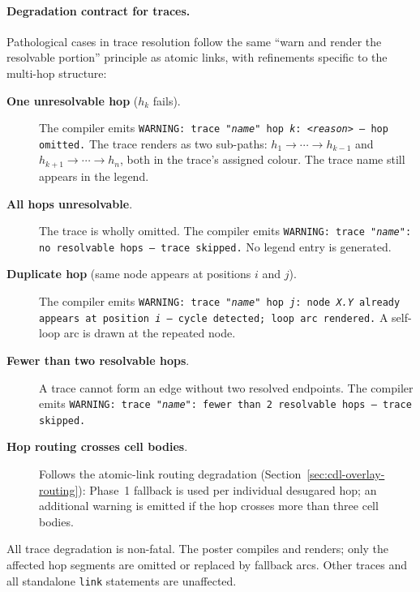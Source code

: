 \paragraph{Degradation contract for traces.}

Pathological cases in trace resolution follow the same ``warn and render
the resolvable portion'' principle as atomic links, with refinements specific
to the multi-hop structure:

\begin{description}
  \item[\textbf{One unresolvable hop} ($h_k$ fails).]  The compiler emits
    \texttt{WARNING: trace "\textit{name}" hop \textit{k}: \textit{<reason>}
    --- hop omitted.}  The trace renders as two sub-paths: $h_1 \to \cdots
    \to h_{k-1}$ and $h_{k+1} \to \cdots \to h_n$, both in the trace's
    assigned colour.  The trace name still appears in the legend.

  \item[\textbf{All hops unresolvable}.]  The trace is wholly omitted.
    The compiler emits \texttt{WARNING: trace "\textit{name}": no resolvable
    hops --- trace skipped.}  No legend entry is generated.

  \item[\textbf{Duplicate hop} (same node appears at positions $i$ and $j$).]
    The compiler emits \texttt{WARNING: trace "\textit{name}" hop \textit{j}:
    node \textit{X.Y} already appears at position \textit{i} --- cycle
    detected; loop arc rendered.}  A self-loop arc is drawn at the repeated
    node.

  \item[\textbf{Fewer than two resolvable hops}.]  A trace cannot form an
    edge without two resolved endpoints.  The compiler emits \texttt{WARNING:
    trace "\textit{name}": fewer than 2 resolvable hops --- trace skipped.}

  \item[\textbf{Hop routing crosses cell bodies}.]  Follows the atomic-link
    routing degradation (Section~\ref{sec:cdl-overlay-routing}): Phase~1
    fallback is used per individual desugared hop; an additional warning is
    emitted if the hop crosses more than three cell bodies.
\end{description}

All trace degradation is non-fatal.  The poster compiles and renders; only
the affected hop segments are omitted or replaced by fallback arcs.  Other
traces and all standalone \texttt{link} statements are unaffected.

